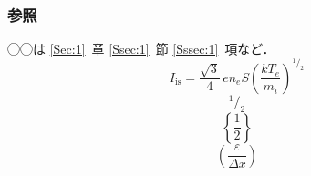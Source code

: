 \documentclass[10pt,a4paper]{ltjsarticle}       %
\newcommand*{\refSec}[1]{\ref{#1}~章}           %
\newcommand*{\refSsec}[1]{\ref{#1}~節}          %
\newcommand*{\refSssec}[1]{\ref{#1}~項}         %
\newcommand{\vDel}{\varDelta}                   %
\newcommand{\veps}{\varepsilon}                 %
\newcommand*{\curly}[1]{\left\{ #1 \right\}}    %
\newcommand*{\bracket}[1]{\left( #1 \right)}    %
\newcommand*\sfrac[2]{{}^{#1}\!/_{#2}}          %
\begin{document}
\subsubsection{参照}
◯◯は \refSec{Sec:1} \refSsec{Ssec:1} \refSssec{Sssec:1}など．
\begin{equation}
  I_{\mathrm{is}} = \dfrac{\sqrt{3}}{4} \, en_{e} S \left( \dfrac{kT_{e}}{m_{i}} \right)^{\sfrac{1}{2}}
\end{equation}
\begin{equation}
  \sfrac{1}{2}
\end{equation}
\begin{equation}
  \curly{\dfrac{1}{2}}
\end{equation}
\begin{equation}
  \bracket{\dfrac{\veps}{\vDel x}}
\end{equation}
\end{document}

